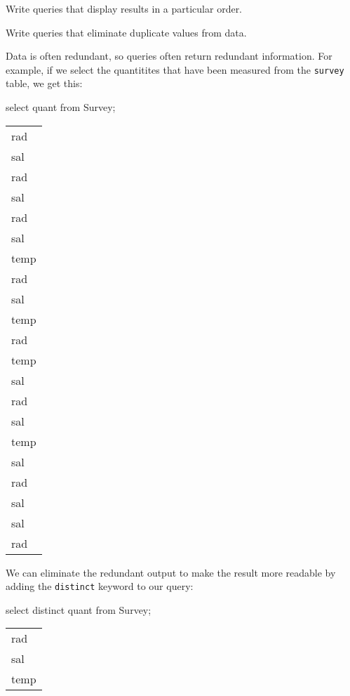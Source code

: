 \documentclass{book}
\begin{document}
\begin{objectives}
\begin{swcitemize}
\item
  Write queries that display results in a particular order.
\item
  Write queries that eliminate duplicate values from data.
\end{swcitemize}
\end{objectives}

Data is often redundant, so queries often return redundant information.
For example, if we select the quantitites that have been measured from
the \texttt{survey} table, we get this:

\begin{VerbIn}
\end{VerbIn}

\begin{VerbIn}
select quant from Survey;
\end{VerbIn}

\begin{tabular}{l}
rad \\
sal \\
rad \\
sal \\
rad \\
sal \\
temp \\
rad \\
sal \\
temp \\
rad \\
temp \\
sal \\
rad \\
sal \\
temp \\
sal \\
rad \\
sal \\
sal \\
rad \\
\end{tabular}

We can eliminate the redundant output to make the result more readable
by adding the \texttt{distinct} keyword to our query:

\begin{VerbIn}
select distinct quant from Survey;
\end{VerbIn}

\begin{tabular}{l}
rad \\
sal \\
temp \\
\end{tabular}
\end{document}
